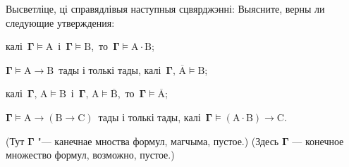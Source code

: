 \begin{problemList}
\smallskip

\problemItemWithCommonPartComplicated
{Высветліце, ці справядлівыя наступныя сцвярджэнні:}
{Выясните, верны ли следующие утверждения:}
{%
\begin{belarusianEnumerate}
    \item калі\, $\boldsymbol{\Gamma} \vDash \boldsymbol{\mathrm{A}}$\, і\, $\boldsymbol{\Gamma}
    \vDash \boldsymbol{\mathrm{B}}$,\, то\, $\boldsymbol{\Gamma} \vDash \boldsymbol{\mathrm{A}} \cdot
    \boldsymbol{\mathrm{B}}$;
    \item $\boldsymbol{\Gamma} \vDash \boldsymbol{\mathrm{A}} \to \boldsymbol{\mathrm{B}}$\, тады
    і толькі тады, калі\, $\boldsymbol{\Gamma},\, \overline{\boldsymbol{\mathrm{A}}} \vDash \boldsymbol{\mathrm{B}}$;
    \item калі\, $\boldsymbol{\Gamma},\, \boldsymbol{\mathrm{A}} \vDash \boldsymbol{\mathrm{B}}$\, і\,
    $\boldsymbol{\Gamma},\, \boldsymbol{\mathrm{A}} \vDash \overline{\boldsymbol{\mathrm{B}}}$,\, то\,
    $\boldsymbol{\Gamma} \vDash \overline{\boldsymbol{\mathrm{A}}}$;
    \item $\boldsymbol{\Gamma} \vDash \boldsymbol{\mathrm{A}} \to (\boldsymbol{\mathrm{B}}
    \to \boldsymbol{\mathrm{C}})$\, тады і толькі тады, калі\, $\boldsymbol{\Gamma} \vDash  (\boldsymbol{\mathrm{A}} \cdot \boldsymbol{\mathrm{B}}) \to \boldsymbol{\mathrm{C}}$.
\end{belarusianEnumerate}
}
{(Тут $\boldsymbol{\Gamma}$ "--- канечнае мноства формул, магчыма, пустое.)}
{(Здесь $\boldsymbol{\Gamma}$ --- конечное множество формул, возможно, пустое.)}

\end{problemList}


